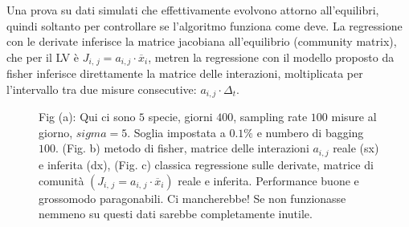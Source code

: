 Una prova su dati simulati che effettivamente evolvono attorno all'equilibri, quindi soltanto per controllare se l'algoritmo funziona come deve. 
La regressione con le derivate inferisce la matrice jacobiana all'equilibrio (community matrix), che per il LV è $J_{i,\,j} = a_{i,j}\cdot \overline{x}_i$, metren la regressione con il modello proposto da fisher inferisce direttamente la matrice delle interazioni, moltiplicata per l'intervallo tra due misure consecutive: $a_{i,j}\cdot \Delta_t$. 
\begin{figure}[H]
    \centering
    \caption{Fig (a): Qui ci sono $5$ specie, giorni $400$, sampling rate $100$ misure al giorno, $sigma=5$. Soglia impostata a $0.1\%$ e numbero di bagging $100$. (Fig. b) metodo di fisher, matrice delle interazioni $a_{i,j}$ reale (sx) e inferita (dx), (Fig. c) classica regressione sulle derivate, matrice di comunità $(J_{i,\,j} = a_{i,\,j}\cdot \overline{x}_i)$ reale e inferita. Performance buone e grossomodo paragonabili. Ci mancherebbe! Se non funzionasse nemmeno su questi dati sarebbe completamente inutile.}
    \label{fig:enter-label}
\end{figure}

